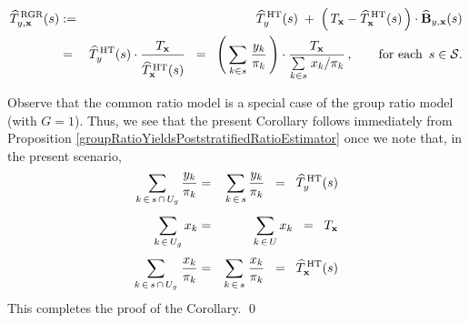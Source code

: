 \begin{corollary}
\begin{eqnarray*}
\widehat{T}^{\,\textnormal{RGR}}_{y,\mathbf{x}}(s)
& := &
	\widehat{T}^{\,\textnormal{HT}}_{y}(s)
	\; + \;
	\left(\,T_{\mathbf{x}} - \widehat{T}^{\,\textnormal{HT}}_{\mathbf{x}}(s) \,\right)
	\cdot
	\widehat{\mathbf{B}}_{y,\mathbf{x}}(s)
\\
& = &
	\widehat{T}^{\,\textnormal{HT}}_{y}(s)
	\cdot
	\dfrac{
		T_{\mathbf{x}}
		}{
		\overset{{\color{white}.}}{\widehat{T}^{\,\textnormal{HT}}_{\mathbf{x}}(s)}
		}
\;\; = \;\;
	\left(\,\underset{k \in s}{\sum}\;\dfrac{y_{k}}{\pi_{k}}\,\right)
	\cdot
 	\dfrac{
		T_{\mathbf{x}}
		}{
		\underset{k \in s}{\sum}\;x_{k}/\pi_{k}
		}
	\,,\quad\quad\textnormal{for each \,$s \in \mathcal{S}$}.
\end{eqnarray*}
\end{corollary}
\proof
Observe that {\color{red}the common ratio model is a special case of the group ratio model} (with $G = 1$).
Thus, we see that the present Corollary follows immediately from
Proposition \ref{groupRatioYieldsPoststratifiedRatioEstimator}
once we note that, in the present scenario,
\begin{eqnarray*}
\underset{k\,\in\,s\,\cap\,U_{g}}{\sum}\, \dfrac{y_{k}}{\pi_{k}}
& = &
	\underset{k\,\in\,s}{\sum}\, \dfrac{y_{k}}{\pi_{k}}
\;\; = \;\;
	\widehat{T}^{\,\textnormal{HT}}_{y}(s)
\\
\underset{k\,\in\,U_{g}}{\overset{{\color{white}.}}{\sum}}\, x_{k}
& = &
	\underset{k\,\in\,U}{\sum}\, x_{k}
\;\; = \;\;
	T_{\mathbf{x}}
\\
\underset{k\,\in\,s\,\cap\,U_{g}}{\overset{{\color{white}.}}{\sum}}\; \dfrac{ x_{k} }{ \pi_{k} }
& = &
	\underset{k\,\in\,s}{\overset{{\color{white}.}}{\sum}}\; \dfrac{ x_{k} }{ \pi_{k} }
\;\; = \;\;
	\widehat{T}^{\,\textnormal{HT}}_{\mathbf{x}}(s)
\end{eqnarray*}
This completes the proof of the Corollary.
\qed


\renewcommand{\theenumi}{\roman{enumi}}
\renewcommand{\labelenumi}{\textnormal{(\theenumi)}$\;\;$}

